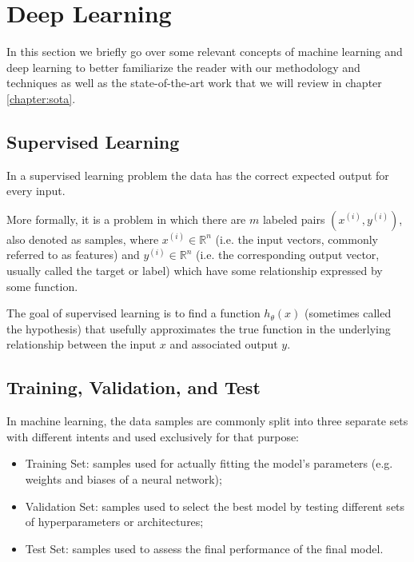 \chapter{Deep Learning}
\label{chapter:deeplearning}

In this section we briefly go over some relevant concepts of machine learning and deep learning to better familiarize the reader with our methodology and techniques as well as the state-of-the-art work that we will review in chapter \ref{chapter:sota}.

\section{Supervised Learning}

In a supervised learning problem the data has the correct expected output for every input.

More formally, it is a problem in which there are $m$ labeled pairs $(x^{(i)}, y^{(i)})$, also denoted as samples, where $x^{(i)} \in \mathbb{R}^n$ (i.e. the input vectors, commonly referred to as features) and $y^{(i)} \in \mathbb{R}^n$ (i.e. the corresponding output vector, usually called the target or label) which have some relationship expressed by some function.

The goal of supervised learning is to find a function $h_{\theta}(x)$ (sometimes called the hypothesis) that usefully approximates the true function in the underlying relationship between the input $x$ and associated output $y$.

\section{Training, Validation, and Test}

In machine learning, the data samples are commonly split into three separate sets with different intents and used exclusively for that purpose:

\begin{itemize}
    \item Training Set: samples used for actually fitting the model's parameters (e.g. weights and biases of a neural network);
    \item Validation Set: samples used to select the best model by testing different sets of hyperparameters or architectures;
    \item Test Set: samples used to assess the final performance of the final model.
\end{itemize}

